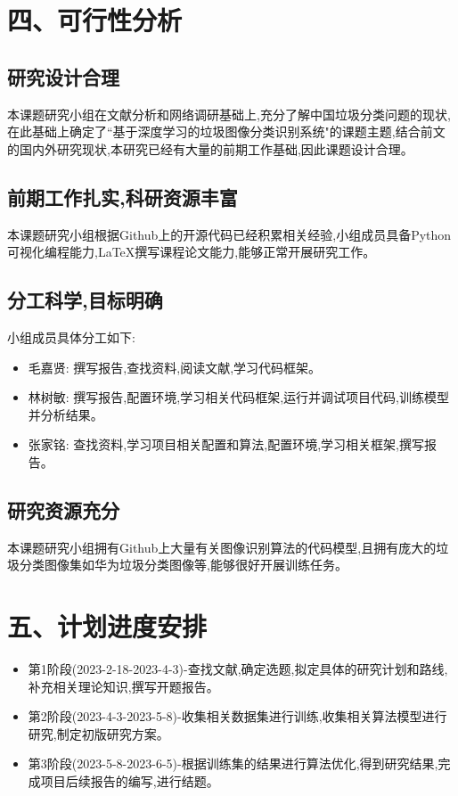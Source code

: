 \documentclass[12pt, a4paper, oneside]{ctexart}
\begin{document}
\section*{四、可行性分析}
\subsection*{研究设计合理}
本课题研究小组在文献分析和网络调研基础上,充分了解中国垃圾分类问题的现状,在此基础上确定了``基于深度学习的垃圾图像分类识别系统"的课题主题,结合前文的国内外研究现状,本研究已经有大量的前期工作基础,因此课题设计合理。
\subsection*{前期工作扎实,科研资源丰富}
本课题研究小组根据Github上的开源代码已经积累相关经验,小组成员具备Python可视化编程能力,LaTeX撰写课程论文能力,能够正常开展研究工作。
\subsection*{分工科学,目标明确}
小组成员具体分工如下:
\begin{itemize}
    \item 毛嘉贤: 撰写报告,查找资料,阅读文献,学习代码框架。
    \item 林树敏: 撰写报告,配置环境,学习相关代码框架,运行并调试项目代码,训练模型并分析结果。
    \item 张家铭: 查找资料,学习项目相关配置和算法,配置环境,学习相关框架,撰写报告。
\end{itemize}
\subsection*{研究资源充分}
本课题研究小组拥有Github上大量有关图像识别算法的代码模型,且拥有庞大的垃圾分类图像集如华为垃圾分类图像等,能够很好开展训练任务。
\newpage
\section*{五、计划进度安排}
\begin{itemize}
    \item 第1阶段(2023-2-18-2023-4-3)-查找文献,确定选题,拟定具体的研究计划和路线,补充相关理论知识,撰写开题报告。
    \item 第2阶段(2023-4-3-2023-5-8)-收集相关数据集进行训练,收集相关算法模型进行研究,制定初版研究方案。
    \item 第3阶段(2023-5-8-2023-6-5)-根据训练集的结果进行算法优化,得到研究结果,完成项目后续报告的编写,进行结题。
\end{itemize}
\end{document}
